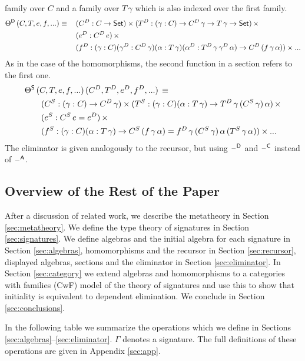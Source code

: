 \documentclass[acmsmall,screen]{acmart}
\begin{document}
family over $C$ and a family over $T\,\gamma$ which is also indexed
over the first family.
\begin{alignat*}{5}
  & \Theta^{\mathsf{D}}\,(C,T,e,f,...)\equiv\, && (C^D:C\rightarrow \mathsf{Set})\times(T^D:(\gamma:C)\rightarrow C^D\,\gamma\rightarrow T\,\gamma\rightarrow \mathsf{Set})\,\times \\
  & && (e^D:C^D\,e)\,\times \\
  & && (f^D:(\gamma:C)(\gamma^D:C^D\,\gamma)(\alpha:T\,\gamma)(\alpha^D:T^D\,\gamma\,\gamma^D\,\alpha)\rightarrow C^D\,(f\,\gamma\,\alpha))\times...
\end{alignat*}
As in the case of the homomorphisms, the second function in a section
refers to the first one.
\begin{alignat*}{5}
  & \Theta^{\mathsf{S}}\,(C,T,e,f,...)\,(C^D,T^D,e^D,f^D,...)\,\equiv \\
  & \hspace{2em} (C^S:(\gamma:C)\rightarrow C^D\,\gamma)\times(T^S:(\gamma:C)(\alpha:T\,\gamma)\rightarrow T^D\,\gamma\,(C^S\,\gamma)\,\alpha)\,\times \\
  & \hspace{2em} (e^S:C^S\,e=e^D)\,\times \\
  & \hspace{2em} (f^S:(\gamma:C)(\alpha:T\,\gamma)\rightarrow C^S\,(f\,\gamma\,\alpha)=f^D\,\gamma\,(C^S\,\gamma)\,\alpha\,(T^S\,\gamma\,\alpha))\times ...
\end{alignat*}
The eliminator is given analogously to the recursor, but using
$\mathord{\hspace{1pt}\text{--}\hspace{1pt}}^{\mathsf{D}}$ and $\mathord{\hspace{1pt}\text{--}\hspace{1pt}}^{\mathsf{C}}$ instead of $\mathord{\hspace{1pt}\text{--}\hspace{1pt}}^{\mathsf{A}}$.

\subsection{Overview of the Rest of the Paper}

After a discussion of related work, we describe the metatheory in
Section \ref{sec:metatheory}. We define the type theory of signatures
in Section \ref{sec:signatures}. We define algebras and the initial
algebra for each signature in Section \ref{sec:algebras},
homomorphisms and the recursor in Section \ref{sec:recursor},
displayed algebras, sections and the eliminator in Section
\ref{sec:eliminator}. In Section \ref{sec:category} we extend algebras
and homomorphisms to a categories with families (CwF) model of the
theory of signatures and use this to show that initiality
is equivalent to dependent elimination. We conclude in
Section \ref{sec:conclusions}.

In the following table we summarize the operations which we define in
Sections \ref{sec:algebras}--\ref{sec:eliminator}. $\Gamma$ denotes a
signature. The full definitions of these operations are given in
Appendix \ref{sec:app}.
\end{document}

